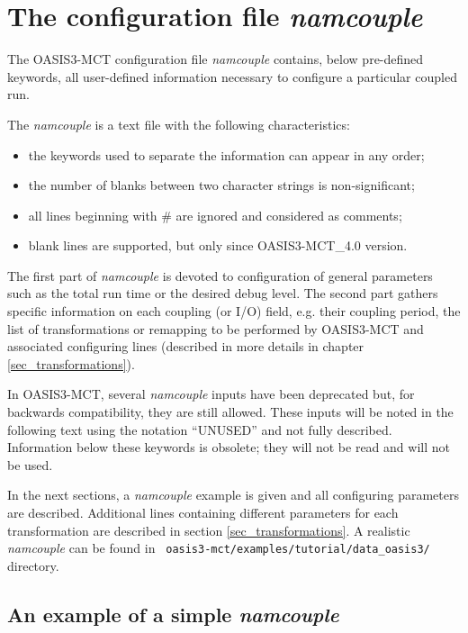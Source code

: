 \newpage
\chapter{The configuration file {\it namcouple}}
\label{sec_namcouple}

The OASIS3-MCT configuration file {\it namcouple} contains, below
pre-defined keywords, all user-defined information necessary to
configure a particular coupled run.

The {\it namcouple} is a text file with the following characteristics:

\begin{itemize}
\item the keywords used to separate the information can appear in any
  order;
\item the number of blanks between two character strings is
  non-significant;
\item all lines beginning with \# are ignored and considered as
  comments;
\item blank lines are supported, but only since OASIS3-MCT\_4.0 version.
\end{itemize}

The first part of {\it namcouple } is devoted to configuration of
general parameters such as the total run time or the desired debug level.
The second part gathers specific
information on each coupling (or I/O) field, e.g. their coupling
period, the list of transformations or remapping to be performed
by OASIS3-MCT and associated configuring lines (described in more
details in chapter \ref{sec_transformations}).

In OASIS3-MCT, several {\it namcouple} inputs have been deprecated
but, for backwards compatibility, they are still allowed.  These
inputs will be noted in the following text using the notation
``UNUSED'' and not fully described. Information below these keywords
is obsolete; they will not be read and will not be used.

In the next sections, a {\it namcouple} example is given and
all configuring parameters are described. Additional lines
containing different parameters for each transformation
are described in section \ref{sec_transformations}. A realistic {\it
  namcouple} can be found in {\tt
  oasis3-mct/examples/tutorial/data\_oasis3/} directory.

\section{An example of a simple {\it namcouple}}
\label{subsec_examplenamcouple}

